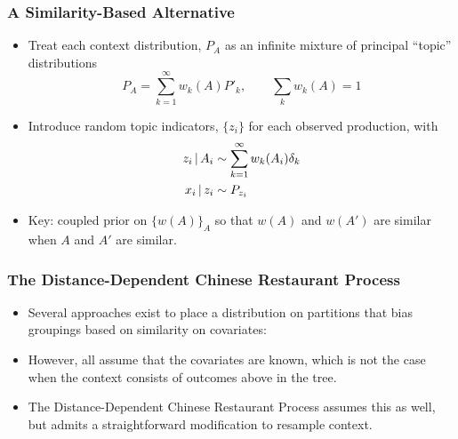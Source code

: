 \documentclass[11pt, serif, mathserif, table,trans]{beamer}
\begin{document}
\begin{frame}
  \frametitle{A Similarity-Based Alternative}
  \begin{itemize}[<+->]
  \item Treat each context distribution, $P_A$ as an infinite mixture
    of principal ``topic'' distributions
    \begin{equation}
      \label{eq:29}
      P_A = \sum_{k=1}^\infty w_k(A) P'_k, \qquad \sum_k w_k(A) = 1
    \end{equation}
  \item Introduce random topic indicators, $\{z_i\}$ for each observed
    production, with 
    \begin{align}
      z_i \, \vert \, A_i &\sim \sum_{k=1}^{\infty} w_k(A_i) \delta_k \\
      x_i \, \vert \, z_i &\sim P_{z_i}
    \end{align}
  \item Key: coupled prior on $\{w(A)\}_A$ so that $w(A)$ and $w(A')$
    are similar when $A$ and $A'$ are similar.
\end{itemize}
\end{frame}

\begin{frame}
  \frametitle{The Distance-Dependent Chinese Restaurant Process}
  \begin{itemize}[<+->]
  \item Several approaches exist to place a distribution on partitions
    that bias groupings based on similarity on covariates: 
    \cite{maceachern2000dependent,dunson2007bayesian,dahl2008distance,muller2011product}
  \item However, all assume that the covariates are known, which is
    not the case when the context consists of outcomes above in the
    tree.
  \item The Distance-Dependent Chinese Restaurant Process
    \cite{blei2011distance} assumes this as well, but admits a
    straightforward modification to resample context.
  \end{itemize}
\end{frame}
\end{document}
